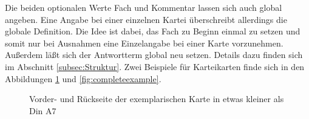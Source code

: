 \documentclass[a4paper,DIV=calc]{scrartcl}
\begin{document}
Die beiden optionalen Werte Fach und Kommentar lassen sich auch global angeben. Eine Angabe bei einer einzelnen Kartei überschreibt allerdings die globale Definition. Die Idee ist dabei, das Fach zu Beginn einmal zu setzen und somit nur bei Ausnahmen eine Einzelangabe bei einer Karte vorzunehmen. Außerdem läßt sich der Antwortterm global neu setzen. Details dazu finden sich im Abschnitt \ref{subsec:Struktur}. Zwei Beispiele für Karteikarten finde sich in den Abbildungen \ref{fig:example} und \ref{fig:completeexample}.
\begin{figure}
	\quad	{}
	\caption{Vorder- und Rückseite der exemplarischen Karte in etwas kleiner als Din A7}\label{fig:example}
\end{figure}
\end{document}
